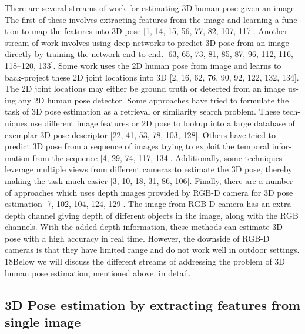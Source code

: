 There are several streams of work for estimating 3D human pose given an image.
The first of these involves extracting features from the image and learning a func-
tion to map the features into 3D pose [1, 14, 15, 56, 77, 82, 107, 117]. Another
stream of work involves using deep networks to predict 3D pose from an image
directly by training the network end-to-end. [63, 65, 73, 81, 85, 87, 96, 112, 116,
118–120, 133]. Some work uses the 2D human pose from image and learns to
back-project these 2D joint locations into 3D [2, 16, 62, 76, 90, 92, 122, 132, 134].
The 2D joint locations may either be ground truth or detected from an image us-
ing any 2D human pose detector. Some approaches have tried to formulate the
task of 3D pose estimation as a retrieval or similarity search problem. These tech-
niques use different image features or 2D pose to lookup into a large database
of exemplar 3D pose descriptor [22, 41, 53, 78, 103, 128]. Others have tried to
predict 3D pose from a sequence of images trying to exploit the temporal infor-
mation from the sequence [4, 29, 74, 117, 134]. Additionally, some techniques
leverage multiple views from different cameras to estimate the 3D pose, thereby
making the task much easier [3, 10, 18, 31, 86, 106]. Finally, there are a number
of approaches which uses depth images provided by RGB-D camera for 3D pose
estimation [7, 102, 104, 124, 129]. The image from RGB-D camera has an extra
depth channel giving depth of different objects in the image, along with the RGB
channels. With the added depth information, these methods can estimate 3D pose
with a high accuracy in real time. However, the downside of RGB-D cameras is
that they have limited range and do not work well in outdoor settings.
18Below we will discuss the different streams of addressing the problem of 3D
human pose estimation, mentioned above, in detail.

\subsection{3D Pose estimation by extracting features from single image}

